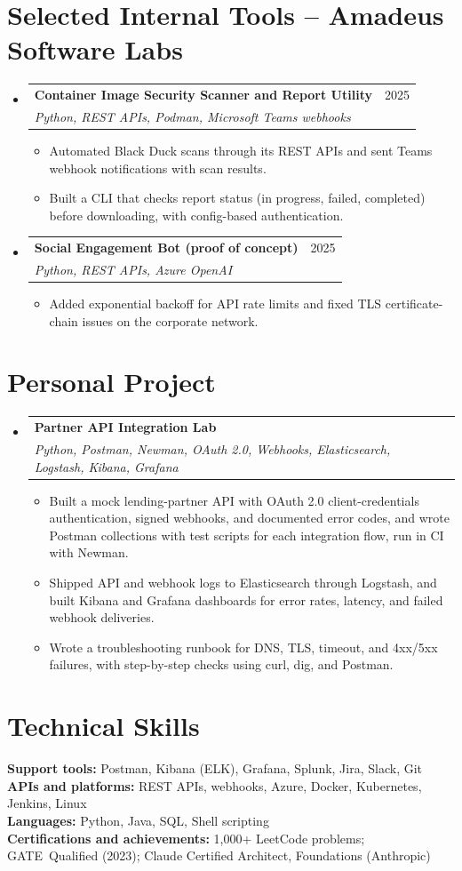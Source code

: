 \documentclass[a4paper,11pt]{article}
\makeatletter
\newcommand{\entry}[4]{\item\begin{tabularx}{\textwidth}{@{}Xr@{}}\textbf{#1}& #2\\\textit{\small #3}&\textit{\small #4}\end{tabularx}\vspace{-5pt}}
\newcommand{\bulletpoint}[1]{\item\small{#1}}
\makeatother
\begin{document}
\section{Selected Internal Tools -- Amadeus Software Labs}
\begin{itemize}[leftmargin=0in,label={}]
  \entry{Container Image Security Scanner and Report Utility}{2025}{Python, REST APIs, Podman, Microsoft Teams webhooks}{}
  \begin{itemize}
    \bulletpoint{Automated Black Duck scans through its REST APIs and sent Teams webhook notif{}ications with scan results.}
    \bulletpoint{Built a CLI that checks report status (in progress, failed, completed) before downloading, with conf{}ig-based authentication.}
  \end{itemize}
  \entry{Social Engagement Bot (proof of concept)}{2025}{Python, REST APIs, Azure OpenAI}{}
  \begin{itemize}
    \bulletpoint{Added exponential backof{}f for API rate limits and f{}ixed TLS certif{}icate-chain issues on the corporate network.}
  \end{itemize}
\end{itemize}

\section{Personal Project}
\begin{itemize}[leftmargin=0in,label={}]
  \entry{Partner API Integration Lab}{}{Python, Postman, Newman, OAuth 2.0, Webhooks, Elasticsearch, Logstash, Kibana, Grafana}{}
  \begin{itemize}
    \bulletpoint{Built a mock lending-partner API with OAuth 2.0 client-credentials authentication, signed webhooks, and documented error codes, and wrote Postman collections with test scripts for each integration f{}low, run in CI with Newman.}
    \bulletpoint{Shipped API and webhook logs to Elasticsearch through Logstash, and built Kibana and Grafana dashboards for error rates, latency, and failed webhook deliveries.}
    \bulletpoint{Wrote a troubleshooting runbook for DNS, TLS, timeout, and 4xx/5xx failures, with step-by-step checks using curl, dig, and Postman.}
  \end{itemize}
\end{itemize}

\section{Technical Skills}
\small\textbf{Support tools:} Postman, Kibana (ELK), Grafana, Splunk, Jira, Slack, Git \\
\textbf{APIs and platforms:} REST APIs, webhooks, Azure, Docker, Kubernetes, Jenkins, Linux \\
\textbf{Languages:} Python, Java, SQL, Shell scripting \\
\textbf{Certif{}ications and achievements:} 1,000+ LeetCode problems; \mbox{GATE Qualif{}ied} (2023); Claude \mbox{Certif{}ied} Architect, Foundations (Anthropic)
\end{document}
